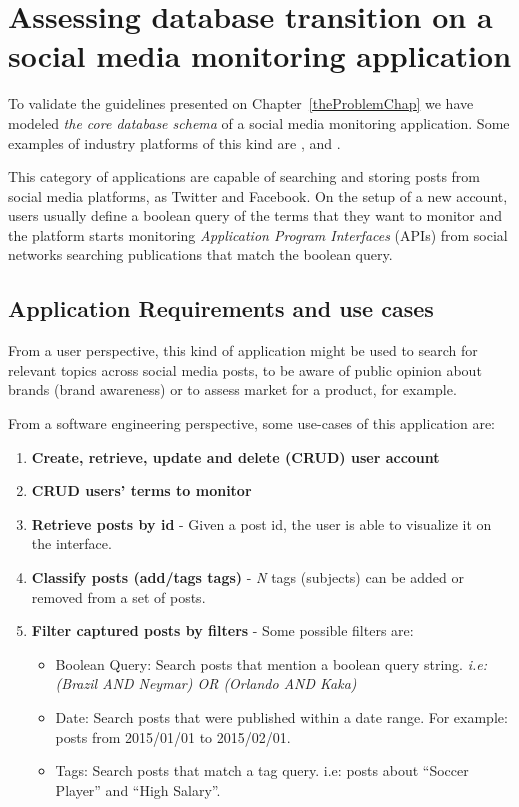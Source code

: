 \section{Assessing database transition on a social media monitoring application}
\label{socmediamonitoringapp}

To validate the guidelines presented on Chapter~\ref{theProblemChap} we have modeled \textit{the core database schema} of a social media monitoring  application. Some examples of industry platforms of this kind are \cite{sproutsocial}, \cite{mention} and \cite{buzzmonitor}. 

This category of applications are capable of searching and storing posts from social media platforms, as Twitter and Facebook. On the setup of a new account, users usually define a boolean query of the terms that they want to monitor and the platform starts monitoring \textit{Application Program Interfaces} (APIs) from social networks searching publications that match the boolean query. 

\subsection{Application Requirements and use cases}
\label{appoperations}
From a user perspective, this kind of application might be used to search for relevant topics across social media posts, to be aware of public opinion about brands (brand awareness) or to assess market for a product, for example. 

From a software engineering perspective, some use-cases of this application are:

\begin{enumerate}
\item{\textbf{Create, retrieve, update and delete (CRUD) user account}}
\item{\textbf{CRUD users' terms to monitor}}


\item{\textbf{Retrieve posts by id} - Given a post id, the user is able to visualize it on the interface.}

\item{\textbf{Classify posts (add/tags tags)} - \textit{N} tags (subjects) can be added or removed from a set of posts.}

\item{\textbf{Filter captured posts by filters} - Some possible filters are: 
\begin{itemize}
\item{Boolean Query:} Search posts that mention a boolean query string. \textit{i.e: (Brazil AND Neymar) OR (Orlando AND Kaka)}
\item{Date:} Search posts that were published within a date range. For example: posts from 2015/01/01 to 2015/02/01.
\item{Tags:} Search posts that match a tag query. i.e: posts about ``Soccer Player'' and ``High Salary''.
\end{itemize}
}

\end{enumerate}

